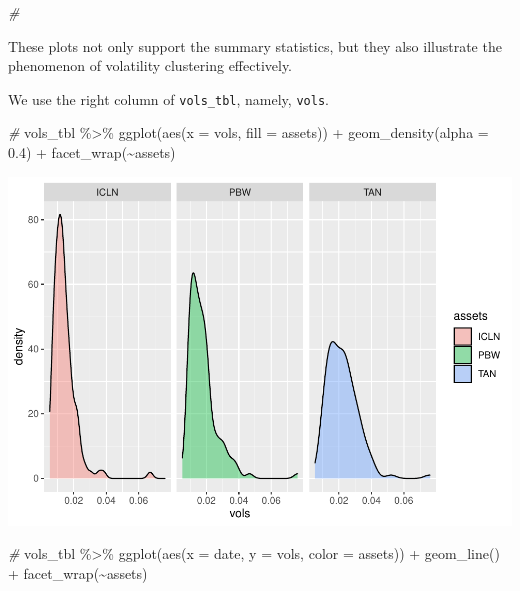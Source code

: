 \documentclass{article}
\newenvironment{Shaded}{\begin{snugshade}}{\end{snugshade}}
\newcommand{\AttributeTok}[1]{\textcolor[rgb]{0.77,0.63,0.00}{#1}}
\newcommand{\CommentTok}[1]{\textcolor[rgb]{0.56,0.35,0.01}{\textit{#1}}}
\newcommand{\FloatTok}[1]{\textcolor[rgb]{0.00,0.00,0.81}{#1}}
\newcommand{\FunctionTok}[1]{\textcolor[rgb]{0.00,0.00,0.00}{#1}}
\newcommand{\NormalTok}[1]{#1}
\newcommand{\SpecialCharTok}[1]{\textcolor[rgb]{0.00,0.00,0.00}{#1}}
\begin{document}
\begin{Shaded}
\begin{Highlighting}[]
\CommentTok{\#}
\end{Highlighting}
\end{Shaded}

These plots not only support the summary statistics, but they also
illustrate the phenomenon of volatility clustering effectively.

We use the right column of \texttt{vols\_tbl}, namely, \texttt{vols}.

\begin{Shaded}
\begin{Highlighting}[]
\CommentTok{\#}
\NormalTok{vols\_tbl }\SpecialCharTok{\%\textgreater{}\%} \FunctionTok{ggplot}\NormalTok{(}\FunctionTok{aes}\NormalTok{(}\AttributeTok{x =}\NormalTok{ vols, }\AttributeTok{fill =}\NormalTok{ assets)) }\SpecialCharTok{+} 
  \FunctionTok{geom\_density}\NormalTok{(}\AttributeTok{alpha =} \FloatTok{0.4}\NormalTok{) }\SpecialCharTok{+} 
  \FunctionTok{facet\_wrap}\NormalTok{(}\SpecialCharTok{\textasciitilde{}}\NormalTok{assets)}
\end{Highlighting}
\end{Shaded}

\includegraphics{market-facts_files/figure-latex/vols-ex-1.pdf}

\begin{Shaded}
\begin{Highlighting}[]
\CommentTok{\#}
\NormalTok{vols\_tbl }\SpecialCharTok{\%\textgreater{}\%} \FunctionTok{ggplot}\NormalTok{(}\FunctionTok{aes}\NormalTok{(}\AttributeTok{x =}\NormalTok{ date, }\AttributeTok{y =}\NormalTok{ vols, }\AttributeTok{color =}\NormalTok{ assets)) }\SpecialCharTok{+}
  \FunctionTok{geom\_line}\NormalTok{() }\SpecialCharTok{+} 
  \FunctionTok{facet\_wrap}\NormalTok{(}\SpecialCharTok{\textasciitilde{}}\NormalTok{assets)}
\end{Highlighting}
\end{Shaded}
\end{document}

